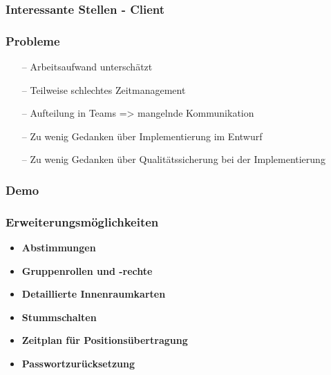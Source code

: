 \documentclass[aspectratio=1610]{beamer}
\begin{document}
  \begin{frame}[plain]
      \frametitle{\textbf{Interessante Stellen - Client}}
  \end{frame}

  \begin{frame}[plain]
      \frametitle{\textbf{Probleme}}
      \begin{itemize}
        \item[--] Arbeitsaufwand unterschätzt
        \item[--] Teilweise schlechtes Zeitmanagement
        \item[--] Aufteilung in Teams => mangelnde Kommunikation
        \item[--] Zu wenig Gedanken über Implementierung im Entwurf
        \item[--] Zu wenig Gedanken über Qualitätssicherung bei der Implementierung
      \end{itemize}
  \end{frame}


  \begin{frame}[plain]
      \frametitle{\textbf{Demo}}

  \end{frame}

  \begin{frame}[plain]
      \frametitle{\textbf{Erweiterungsmöglichkeiten}}
        \begin{itemize}
          \item \textbf{Abstimmungen}
          \item \textbf{Gruppenrollen und -rechte}
          \item \textbf{Detaillierte Innenraumkarten}
          \item \textbf{Stummschalten}
          \item \textbf{Zeitplan für Positionsübertragung}
          \item \textbf{Passwortzurücksetzung}
        \end{itemize}
  \end{frame}
\end{document}
